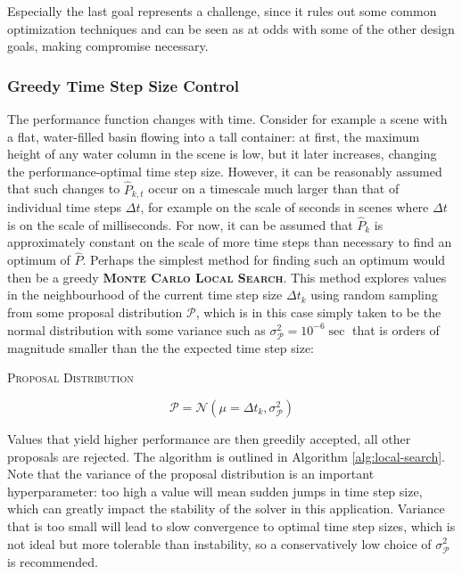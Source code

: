 \documentclass[oneside, a4paper]{book}
\newcommand\emphasis[1]{{\scshape\bfseries#1}}
\newcommand{\equationnamed}[2]{%
  \setlength{\fboxsep}{2pt} %
  \setlength{\fboxrule}{0.01pt}
  \begin{center}
    \begin{minipage}{\textwidth}
      \begin{center}\textsc{#1}\end{center}
      #2
    \end{minipage}
  \end{center}
}
\newcommand\br[1]{\left(#1\right)}
\begin{document}
    Especially the last goal represents a challenge, since it rules out some common optimization techniques and can be seen as at odds with some of the other design goals, making compromise necessary.

    \subsubsection{Greedy Time Step Size Control}
    The performance function changes with time. Consider for example a scene with a flat, water-filled basin flowing into a tall container: at first, the maximum height of any water column in the scene is low, but it later increases, changing the performance-optimal time step size. However, it can be reasonably assumed that such changes to $\hat{P}_{k,t}$ occur on a timescale much larger than that of individual time steps $\Delta t$, for example on the scale of seconds in scenes where $\Delta t$ is on the scale of milliseconds. For now, it can be assumed that $\hat{P}_k$ is approximately constant on the scale of more time steps than necessary to find an optimum of $\hat{P}$. Perhaps the simplest method for finding such an optimum would then be a greedy \emphasis{Monte Carlo Local Search}. This method explores values in the neighbourhood of the current time step size $\Delta t_k$ using random sampling from some proposal distribution $\mathcal{P}$, which is in this case simply taken to be the normal distribution with some variance such as $\sigma^2_\mathcal{P}=10^{-6}\sec$ that is orders of magnitude smaller than the the expected time step size:
    \equationnamed{Proposal Distribution}{
    \begin{equation}
      \mathcal{P} = \mathcal{N}\br{\mu = \Delta t_k, \sigma^2_\mathcal{P}}
    \end{equation}
    }

    Values that yield higher performance are then greedily accepted, all other proposals are rejected. The algorithm is outlined in Algorithm \ref{alg:local-search}.
    Note that the variance of the proposal distribution is an important hyperparameter: too high a value will mean sudden jumps in time step size, which can greatly impact the stability of the solver in this application. Variance that is too small will lead to slow convergence to optimal time step sizes, which is not ideal but more tolerable than instability, so a conservatively low choice of $\sigma^2_\mathcal{P}$ is recommended.
\end{document}
